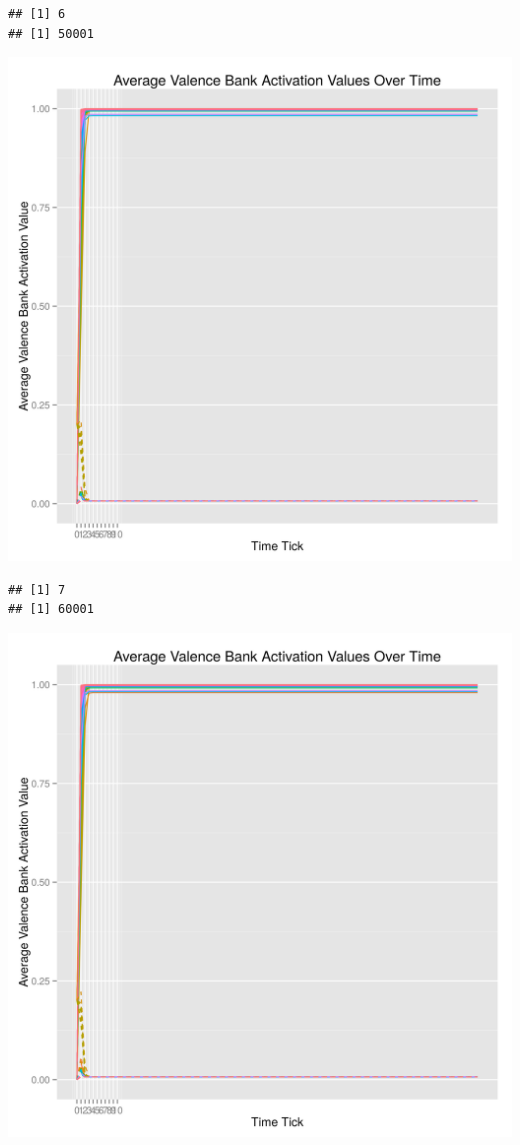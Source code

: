 \documentclass{article}\usepackage[]{graphicx}\usepackage[]{color}
\makeatletter
\def\maxwidth{ %
  \ifdim\Gin@nat@width>\linewidth
    \linewidth
  \else
    \Gin@nat@width
  \fi
}
\newenvironment{kframe}{%
 \def\at@end@of@kframe{}%
 \ifinner\ifhmode%
  \def\at@end@of@kframe{\end{minipage}}%
  \begin{minipage}{\columnwidth}%
 \fi\fi%
 \def\FrameCommand##1{\hskip\@totalleftmargin \hskip-\fboxsep
 \colorbox{shadecolor}{##1}\hskip-\fboxsep
     \hskip-\linewidth \hskip-\@totalleftmargin \hskip\columnwidth}%
 \MakeFramed {\advance\hsize-\width
   \@totalleftmargin\z@ \linewidth\hsize
   \@setminipage}}%
 {\par\unskip\endMakeFramed%
 \at@end@of@kframe}
\newenvironment{knitrout}{}{} %
\makeatother
\begin{document}
\begin{knitrout}
\begin{kframe}\begin{verbatim}
## [1] 6
## [1] 50001
\end{verbatim}
\end{kframe}
\includegraphics[width=\maxwidth]{figure/unnamed-chunk-26} 
\begin{kframe}\begin{verbatim}
## [1] 7
## [1] 60001
\end{verbatim}
\end{kframe}
\includegraphics[width=\maxwidth]{figure/unnamed-chunk-27} 

\end{knitrout}
\end{document}
